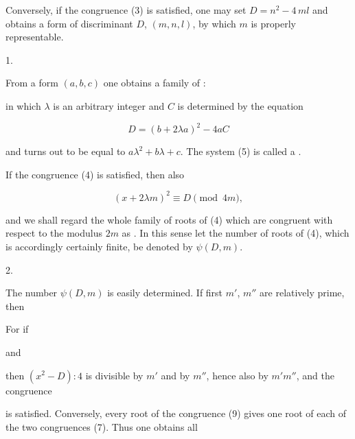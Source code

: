 Conversely, if the congruence (3) is satisfied, one may set
$D = n^2 - 4\,ml$ and obtains a form of discriminant $D$,
$(m, n, l)$, by which $m$ is properly representable.

1. 



From a form $(a,b,c)$ one obtains a family of :


in which $\lambda$ is an arbitrary integer and $C$ is determined by
the equation

\[ D = (b+2\lambda a)^2 - 4aC \]

and turns out to be equal to $a\lambda^2+b\lambda+c$. The system (5)
is called a .

If the congruence (4) is satisfied, then also

\[ (x+2\lambda m)^2 \equiv D \pmod{4m}, \]

and we shall regard the whole family of roots of (4) which are
congruent with respect to the modulus $2m$ as . In
this sense let the number of roots of (4), which is accordingly
certainly finite, be denoted by $\psi(D,m)$.

2. 

The number $\psi(D,m)$ is easily determined. If first
$m'$, $m''$ are relatively prime, then


For if


and


then $(x^2-D):4$ is divisible by $m'$ and by $m''$, hence also by
$m'm''$, and the congruence


is satisfied. Conversely, every root of the congruence (9) gives one
root of each of the two congruences (7). Thus one obtains all
